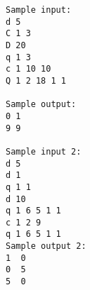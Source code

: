 \begin{verbatim}
Sample input: 
d 5 
C 1 3 
D 20 
q 1 3 
c 1 10 10 
Q 1 2 18 1 1 

Sample output: 
0 1 
9 9  

Sample input 2:
d 5
d 1
q 1 1
d 10
q 1 6 5 1 1
c 1 2 9
q 1 6 5 1 1
Sample output 2:
1  0
0  5
5  0
\end{verbatim}

 

 

 